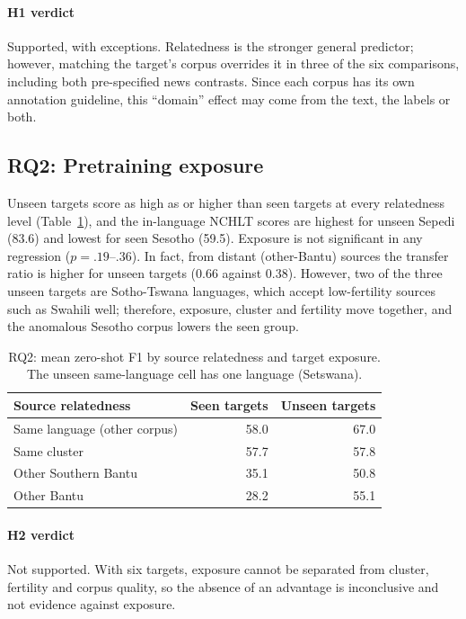 \paragraph{H1 verdict} Supported, with exceptions. Relatedness is the stronger general predictor; however, matching the target's corpus overrides it in three of the six comparisons, including both pre-specified news contrasts. Since each corpus has its own annotation guideline, this ``domain'' effect may come from the text, the labels or both.

\subsection{RQ2: Pretraining exposure}\label{sec:res-rq2}
Unseen targets score as high as or higher than seen targets at every relatedness level (Table~\ref{tab:rq2}), and the in-language NCHLT scores are highest for unseen Sepedi (83.6) and lowest for seen Sesotho (59.5). Exposure is not significant in any regression ($p=.19$--$.36$). In fact, from distant (other-Bantu) sources the transfer ratio is higher for unseen targets (0.66 against 0.38). However, two of the three unseen targets are Sotho-Tswana languages, which accept low-fertility sources such as Swahili well; therefore, exposure, cluster and fertility move together, and the anomalous Sesotho corpus lowers the seen group.

\begin{table}[t]
\centering\footnotesize
\caption{RQ2: mean zero-shot F1 by source relatedness and target exposure. The unseen same-language cell has one language (Setswana).}
\label{tab:rq2}
\begin{tabular}{@{}lrr@{}}
\toprule
Source relatedness & Seen targets & Unseen targets\\
\midrule
Same language (other corpus) & 58.0 & 67.0\\
Same cluster & 57.7 & 57.8\\
Other Southern Bantu & 35.1 & 50.8\\
Other Bantu & 28.2 & 55.1\\
\bottomrule
\end{tabular}
\end{table}

\paragraph{H2 verdict} Not supported. With six targets, exposure cannot be separated from cluster, fertility and corpus quality, so the absence of an advantage is inconclusive and not evidence against exposure.

